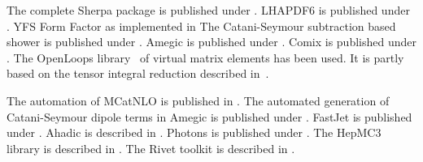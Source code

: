 \documentclass{article}
\begin{document}
The complete Sherpa package is published under \cite{Sherpa:2024mfk}.
LHAPDF6 is published under \cite{Buckley:2014ana}.
YFS Form Factor as implemented in \cite{Jadach:1999vf}
The Catani-Seymour subtraction based shower is published under \cite{Schumann:2007mg}.
Amegic is published under \cite{Krauss:2001iv}.
Comix is published under \cite{Gleisberg:2008fv}.
The OpenLoops library~\cite{Cascioli:2011va} of virtual
matrix elements has been used. 
It is partly based on the tensor integral reduction described 
in~\cite{Denner:2002ii,Denner:2005nn,Denner:2010tr}.

The automation of MCatNLO is published in \cite{Hoeche:2011fd}.
The automated generation of Catani-Seymour dipole terms in Amegic is published under \cite{Gleisberg:2007md}.
FastJet is published under \cite{Cacciari:2011ma}.
Ahadic is described in \cite{Chahal:2022rid}.
Photons is published under \cite{Schonherr:2008av}.
The HepMC3 library is described in \cite{Buckley:2019xhk}.
The Rivet toolkit is described in \cite{Bierlich:2019rhm}.
\end{document}
